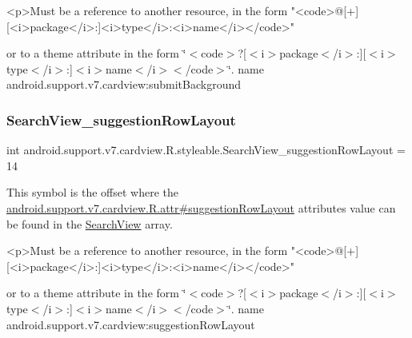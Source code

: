 \begin{DoxyVerb}      <p>Must be a reference to another resource, in the form "<code>@[+][<i>package</i>:]<i>type</i>:<i>name</i></code>"
\end{DoxyVerb}
 or to a theme attribute in the form \char`\"{}$<$code$>$?\mbox{[}$<$i$>$package$<$/i$>$\+:\mbox{]}\mbox{[}$<$i$>$type$<$/i$>$\+:\mbox{]}$<$i$>$name$<$/i$>$$<$/code$>$\char`\"{}.  name android.\+support.\+v7.\+cardview\+:submit\+Background \mbox{\label{classandroid_1_1support_1_1v7_1_1cardview_1_1R_1_1styleable_a97ae2d4d4adca4dd298ad724f0819aac}} 
\subsubsection{\texorpdfstring{Search\+View\+\_\+suggestion\+Row\+Layout}{SearchView\_suggestionRowLayout}}
{\footnotesize\ttfamily int android.\+support.\+v7.\+cardview.\+R.\+styleable.\+Search\+View\+\_\+suggestion\+Row\+Layout = 14\hspace{0.3cm}{\ttfamily [static]}}

This symbol is the offset where the \hyperlink{classandroid_1_1support_1_1v7_1_1cardview_1_1R_1_1attr_ac8f6b21ae8cc1f561a1b39681bf76d69}{android.\+support.\+v7.\+cardview.\+R.\+attr\#suggestion\+Row\+Layout} attribute\textquotesingle{}s value can be found in the \hyperlink{classandroid_1_1support_1_1v7_1_1cardview_1_1R_1_1styleable_a6a300ecad88f70a7642265f73ff4d33f}{Search\+View} array.

\begin{DoxyVerb}      <p>Must be a reference to another resource, in the form "<code>@[+][<i>package</i>:]<i>type</i>:<i>name</i></code>"
\end{DoxyVerb}
 or to a theme attribute in the form \char`\"{}$<$code$>$?\mbox{[}$<$i$>$package$<$/i$>$\+:\mbox{]}\mbox{[}$<$i$>$type$<$/i$>$\+:\mbox{]}$<$i$>$name$<$/i$>$$<$/code$>$\char`\"{}.  name android.\+support.\+v7.\+cardview\+:suggestion\+Row\+Layout \mbox{\label{classandroid_1_1support_1_1v7_1_1cardview_1_1R_1_1styleable_af547d6c74440f698844627ab90d35a40}} 
